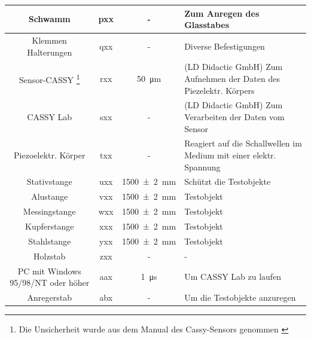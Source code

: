 \documentclass[11pt]{scrartcl}
\begin{document}
\begin{longtable}{c|c|S|p{19em}}
        Schwamm                            & pxx       & { - }             & Zum Anregen des Glasstabes                                                            \\ \hline
        Klemmen Halterungen                & qxx       & { - }             & Diverse Befestigungen                                                                 \\ \hline
        Sensor-CASSY \footnote{Die Unsicherheit wurde aus dem Manual des Cassy-Sensors genommen \cite{cassylab}}                       & rxx       & \SI{50}{\um}     & (LD Didactic GmbH) Zum Aufnehmen der Daten des Piezelektr. Körpers                    \\ \hline
        CASSY Lab                          & sxx       & { - }             & (LD Didactic GmbH) Zum Verarbeiten der Daten vom Sensor                               \\ \hline
        Piezoelektr. Körper                & txx       & { - }             & Reagiert auf die Schallwellen im Medium mit einer elektr. Spannung                    \\ \hline
        Stativstange                       & uxx       & \SI{1500(2)}{\mm} & Schützt die Testobjekte                                                               \\ \hline
        Alustange                          & vxx       & \SI{1500(2)}{\mm} & Testobjekt                                                                            \\ \hline
        Messingstange                      & wxx       & \SI{1500(2)}{\mm} & Testobjekt                                                                            \\ \hline
        Kupferstange                       & xxx       & \SI{1500(2)}{\mm} & Testobjekt                                                                            \\ \hline
        Stahlstange                        & yxx       & \SI{1500(2)}{\mm} & Testobjekt                                                                            \\ \hline
        Holzstab                           & zxx       & { - }             & { - }                                                                                 \\ \hline
        PC mit Windows 95/98/NT oder höher & aax       & \SI{1}{\us}       & Um CASSY Lab zu laufen                                                                \\ \hline
        Anregerstab                        & abx       & { - }             & Um die Testobjekte anzuregen                                                          \\ \hline
                                             
        \hline
\end{longtable}
\end{document}
